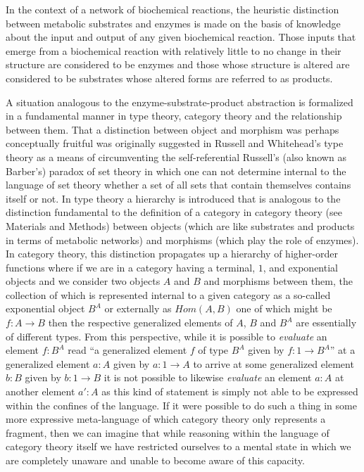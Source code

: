 \documentclass[10pt]{article}
\begin{document}
In the context of a network of biochemical reactions, the heuristic distinction between metabolic substrates and enzymes is made on the basis of knowledge about the input and output of any given biochemical reaction. Those inputs that emerge from a biochemical reaction with relatively little to no change in their structure are considered to be enzymes and those whose structure is altered are considered to be substrates whose altered forms are referred to as products. 

A situation analogous to the enzyme-substrate-product abstraction  is formalized in a fundamental manner in type theory, category theory and the relationship between them. That a distinction between object and morphism was perhaps conceptually fruitful was originally suggested in Russell and Whitehead's type theory as a means of circumventing the self-referential Russell's (also known as Barber's) paradox of set theory in which one can not determine internal to the language of set theory whether a set of all sets that contain themselves contains itself or not. In type theory a hierarchy is introduced that is analogous to the distinction fundamental to the definition of a category in category theory (see Materials and Methods) between objects (which are like substrates and products in terms of metabolic networks) and morphisms (which play the role of enzymes). In category theory, this distinction propagates up a hierarchy of higher-order functions where if we are in a category having a terminal, $1$, and exponential objects and we consider two objects $A$ and $B$ and morphisms between them, the collection of which is represented internal to a given category as a so-called exponential object $B^A$ or externally as $Hom(A,B)$ one of which might be $f \colon A \rightarrow B$ then the respective generalized elements of $A$, $B$ and $B^A$ are essentially of different types. From this perspective, while it is possible to \emph{evaluate} an element $f:B^A$ read ``a generalized element $f$ of type $B^A$ given by $f \colon 1 \rightarrow B^A$'' at a generalized element $a:A$ given by $a \colon 1 \rightarrow A$ to arrive at some generalized element $b:B$ given by $b \colon 1 \rightarrow B$ it is not possible to likewise \emph{evaluate} an element $a:A$ at another element $a':A$ as this kind of statement is simply not able to be expressed within the confines of the language. If it were possible to do such a thing in some more expressive meta-language of which category theory only represents a fragment, then we can imagine that while reasoning within the language of category theory itself we have restricted ourselves to a mental state in which we are completely unaware and unable to become aware of this capacity.
\end{document}
